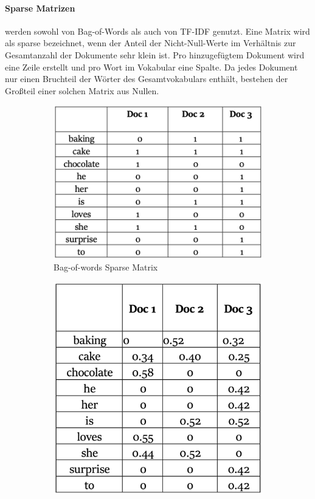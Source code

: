 \paragraph{Sparse Matrizen} werden sowohl von Bag-of-Words als auch von TF-IDF genutzt. Eine Matrix wird als sparse bezeichnet, 
wenn der Anteil der Nicht-Null-Werte im Verhältnis zur Gesamtanzahl der Dokumente sehr klein ist. Pro hinzugefügtem Dokument wird eine Zeile 
erstellt und pro Wort im Vokabular eine Spalte. Da jedes Dokument nur einen Bruchteil der Wörter des Gesamtvokabulars enthält, bestehen
der Großteil einer solchen Matrix aus Nullen.

\begin{figure}[h]
    \begin{subfigure}{0.5\textwidth}
        \centering
        \includegraphics[scale=0.5]{static/table_bow.png}
        \caption{\label{fig:table_bow} Bag-of-words Sparse Matrix \cite{Buddhadev2025}}
    \end{subfigure}
    \begin{subfigure}{0.5\textwidth}
        \centering
        \includegraphics[scale=0.25]{static/table_tf-idf.png}

\end{subfigure}
\end{figure}
